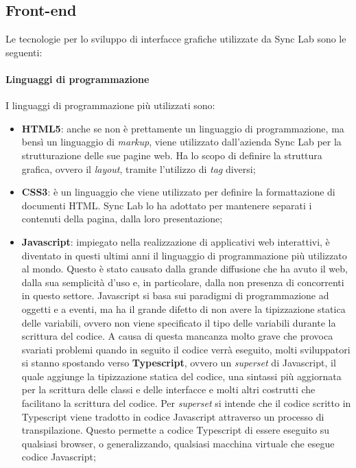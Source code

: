 \subsection{Front-end}
Le tecnologie per lo sviluppo di interfacce grafiche utilizzate da Sync Lab sono le seguenti:

\paragraph{Linguaggi di programmazione} 
I linguaggi di programmazione più utilizzati sono:
\begin{itemize}
  \item \textbf{HTML5}: anche se non è prettamente un linguaggio di programmazione, ma bensì un linguaggio di \textit{markup}, viene utilizzato dall'azienda Sync Lab per la strutturazione delle sue pagine web. Ha lo scopo di definire la struttura grafica, ovvero il \textit{layout}, tramite l'utilizzo di \textit{tag} diversi;
  
  \item \textbf{CSS3}: è un linguaggio che viene utilizzato per definire la formattazione di documenti HTML. Sync Lab lo ha adottato per mantenere separati i contenuti della pagina, dalla loro presentazione;

  \item \textbf{Javascript}: impiegato nella realizzazione di applicativi web interattivi, è diventato in questi ultimi anni il linguaggio di programmazione più utilizzato al mondo. Questo è stato causato dalla grande diffusione che ha avuto il web, dalla sua semplicità d'uso e, in particolare, dalla non presenza di concorrenti in questo settore. Javascript si basa sui paradigmi di programmazione ad oggetti e a eventi, ma ha il grande difetto di non avere la tipizzazione statica delle variabili, ovvero non viene specificato il tipo delle variabili durante la scrittura del codice. A causa di questa mancanza molto grave che provoca svariati problemi quando in seguito il codice verrà eseguito, molti sviluppatori si stanno spostando verso \textbf{Typescript}, ovvero un \textit{superset} di Javascript, il quale aggiunge la tipizzazione statica del codice, una sintassi più aggiornata per la scrittura delle classi e delle interfacce e molti altri costrutti che facilitano la scrittura del codice. Per \textit{superset} si intende che il codice scritto in Typescript viene tradotto in codice Javascript attraverso un processo di transpilazione. Questo permette a codice Typescript di essere eseguito su qualsiasi browser, o generalizzando, qualsiasi macchina virtuale che esegue codice Javascript;
  

\end{itemize}
